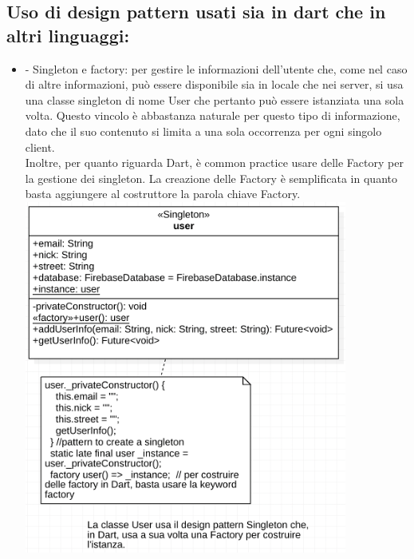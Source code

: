 \documentclass{article}
\begin{document}
\subsection{Uso di design pattern usati sia in dart che in altri linguaggi:}
\begin{itemize}
    \item -	Singleton e factory: per gestire le informazioni dell’utente che, come nel caso di altre informazioni, può essere disponibile sia in locale che nei server, si usa una classe singleton di nome User che pertanto può essere istanziata una sola volta. Questo vincolo è abbastanza naturale per questo tipo di informazione, dato che il suo contenuto si limita a una sola occorrenza per ogni singolo client. 
\\Inoltre, per quanto riguarda Dart, è common practice usare delle Factory per la gestione dei singleton. La creazione delle Factory è semplificata in quanto basta aggiungere al costruttore la parola chiave Factory. 
\\ \includegraphics{Immagini/userClass.png} 


\end{itemize}
\end{document}
